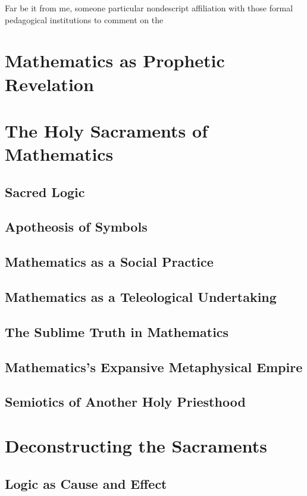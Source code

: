 \documentclass{article}
\begin{document}
	Far be it from me, someone particular nondescript affiliation with those formal pedagogical institutions to comment on the 
	
	\section{Mathematics as Prophetic Revelation}
	
	\section{The Holy Sacraments of Mathematics}
	\subsection{Sacred Logic}
	\subsection{Apotheosis of Symbols}
	\subsection{Mathematics as a Social Practice}
	\subsection{Mathematics as a Teleological Undertaking}
	\subsection{The Sublime Truth in Mathematics}
	\subsection{Mathematics's Expansive Metaphysical Empire}
	\subsection{Semiotics of Another Holy Priesthood}
	\section{Deconstructing the Sacraments}
	\subsection{Logic as Cause and Effect}
	
	
\end{document}
